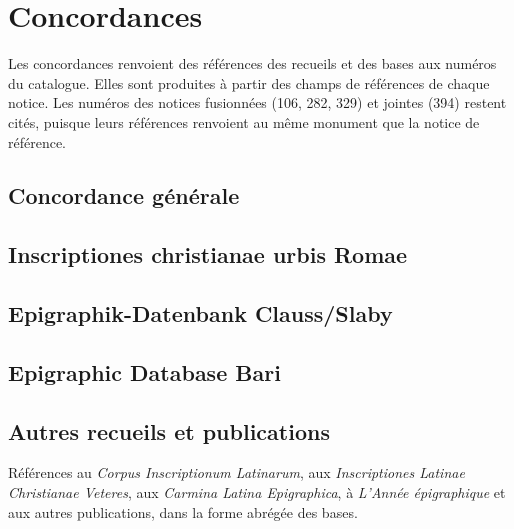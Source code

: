 \chapter{Concordances}\label{ch:concordances}

Les concordances renvoient des références des recueils et des bases aux numéros du catalogue. Elles sont produites à partir des champs de références de chaque notice. Les numéros des notices fusionnées (106, 282, 329) et jointes (394) restent cités, puisque leurs références renvoient au même monument que la notice de référence.

\section{Concordance générale}

{\small

}

\section{Inscriptiones christianae urbis Romae}



\section{Epigraphik-Datenbank Clauss/Slaby}



\section{Epigraphic Database Bari}



\section{Autres recueils et publications}

Références au \emph{Corpus Inscriptionum Latinarum}, aux \emph{Inscriptiones Latinae Christianae Veteres}, aux \emph{Carmina Latina Epigraphica}, à \emph{L’Année épigraphique} et aux autres publications, dans la forme abrégée des bases.


